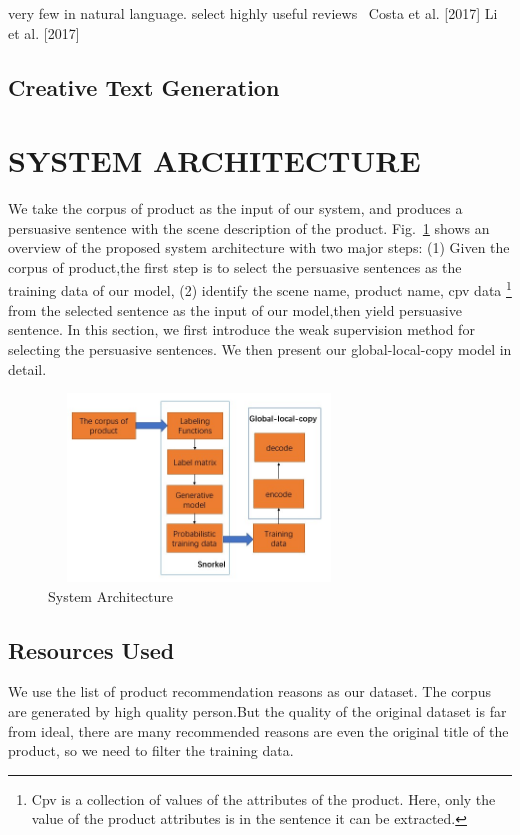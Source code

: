 \documentclass[sigconf]{acmart}
\begin{document}
very few in natural language. select highly useful reviews~\cite{Chen2018Neural} Costa et al. [2017] Li et al. [2017]
\subsection{Creative Text Generation}


\section{SYSTEM ARCHITECTURE}\label{sec:architecture}
We take the corpus of product as the input of our system, and produces a persuasive sentence with the scene description of the product. Fig.~\ref{fig:system-architecture} shows an overview of the proposed system architecture with two major steps: (1) Given the corpus of product,the first step is to select the persuasive sentences as the training data of our model, (2) identify the scene name, product name, cpv data \footnote{Cpv is a collection of values of the attributes of the product. Here, only the value of the product attributes is in the sentence it can be extracted.} from the selected sentence as the input of our model,then yield persuasive sentence. In this section, we first introduce the weak supervision method for selecting the persuasive sentences. We then present our global-local-copy model in detail.  

\begin{figure}
    \centering
    \includegraphics[width=8cm,height=5cm]{system-architecture.jpg}
\caption{System Architecture}\label{fig:system-architecture}
\end{figure}

\subsection{Resources Used}
We use the list of product recommendation reasons as our dataset. The corpus are generated by high quality person.But the quality of the original dataset is far from ideal, there are many recommended reasons are even the original title of the product, so we need to filter the training data.
\end{document}
